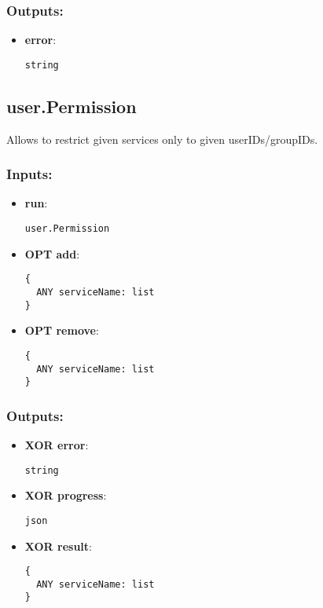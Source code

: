 \subsubsection*{Outputs:}
\begin{itemize}
    \item \textbf{error}: 
\begin{lstlisting}
string
\end{lstlisting}
  \end{itemize}

\subsection{user.Permission}
\label{ch:builtinservices:user.Permission}
Allows to restrict given services only to given userIDs/groupIDs.
\subsubsection*{Inputs:}
\begin{itemize}
    \item \textbf{run}: 
\begin{lstlisting}
user.Permission
\end{lstlisting}
    \item \textbf{OPT add}: 
\begin{lstlisting}
{
  ANY serviceName: list
}
\end{lstlisting}
    \item \textbf{OPT remove}: 
\begin{lstlisting}
{
  ANY serviceName: list
}
\end{lstlisting}
  \end{itemize}

\subsubsection*{Outputs:}
\begin{itemize}
    \item \textbf{XOR error}: 
\begin{lstlisting}
string
\end{lstlisting}
    \item \textbf{XOR progress}: 
\begin{lstlisting}
json
\end{lstlisting}
    \item \textbf{XOR result}: 
\begin{lstlisting}
{
  ANY serviceName: list
}
\end{lstlisting}
  \end{itemize}

